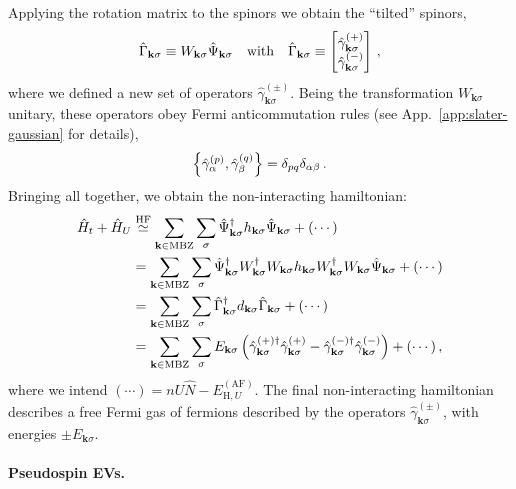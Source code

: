 Applying the rotation matrix to the spinors we obtain the ``tilted'' spinors,
\begin{equation}\label{eq:af-Gamma=WPsi}
	\hat\Gamma_{\mathbf{k}\sigma} \equiv W_{\mathbf{k}\sigma} \hat \Psi_{\mathbf{k}\sigma}
	\qq{with}
	\hat\Gamma_{\mathbf{k}\sigma} \equiv \begin{bmatrix}
		\hat \gamma_{\mathbf{k}\sigma}^{(+)} \\ \hat \gamma_{\mathbf{k}\sigma}^{(-)}
	\end{bmatrix} \, ,
\end{equation}
where we defined a new set of operators $\hat \gamma^{(\pm)}_{\mathbf{k}\sigma}$. Being the transformation $W_{\mathbf{k}\sigma}$ unitary, these operators obey Fermi anticommutation rules (see App.~\ref{app:slater-gaussian} for details),
\[
	\acomm{\hat \gamma_\alpha^{(p)}}{\hat \gamma_\beta^{(q)}} = \delta_{pq} \delta_{\alpha\beta} \, .
\]
Bringing all together, we obtain the non-interacting hamiltonian:
\begin{align}
	\hat H_t + \hat H_U &\stackrel{\mathrm{HF}}{\simeq} \sum_{\mathbf{k} \in \mathrm{MBZ}} \sum_\sigma \hat \Psi_{\mathbf{k}\sigma}^\dagger h_{\mathbf{k}\sigma} \hat \Psi_{\mathbf{k}\sigma} + (\cdots) \nonumber \\
	&= \sum_{\mathbf{k} \in \mathrm{MBZ}} \sum_\sigma \hat \Psi_{\mathbf{k}\sigma}^\dagger W_{\mathbf{k}\sigma}^\dagger W_{\mathbf{k}\sigma} h_{\mathbf{k}\sigma} W_{\mathbf{k}\sigma}^\dagger W_{\mathbf{k}\sigma} \hat \Psi_{\mathbf{k}\sigma} + (\cdots) \nonumber \\
	&= \sum_{\mathbf{k} \in \mathrm{MBZ}} \sum_\sigma \hat \Gamma_{\mathbf{k}\sigma}^\dagger d_{\mathbf{k}\sigma} \hat \Gamma_{\mathbf{k}\sigma} + (\cdots) \nonumber \\
	&= \sum_{\mathbf{k} \in \mathrm{MBZ}} \sum_\sigma E_{\mathbf{k}\sigma} \left(
	\hat \gamma_{\mathbf{k}\sigma}^{(+)\dagger} \hat \gamma_{\mathbf{k}\sigma}^{(+)} - \hat \gamma_{\mathbf{k}\sigma}^{(-)\dagger} \hat \gamma_{\mathbf{k}\sigma}^{(-)}
	\right) + (\cdots) \label{eq:af-hm-bog} \, ,
\end{align}
where we intend $(\cdots) = nU \hat N -  E_{\mathrm{H},U}^{(\mathrm{AF})}$. The final non-interacting hamiltonian describes a free Fermi gas of fermions described by the operators $\hat \gamma^{(\pm)}_{\mathbf{k}\sigma}$, with energies $\pm E_{\mathbf{k}\sigma}$.

\paragraph{Pseudospin EVs.}

